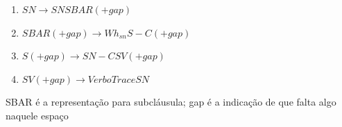\begin{enumerate}
  \item $SN \rightarrow SN SBAR(+gap)$
  \item $SBAR(+gap) \rightarrow Wh_{sn} S-C(+gap)$
  \item $S(+gap) \rightarrow SN-C SV(+gap)$
  \item $SV(+gap) \rightarrow Verbo Trace SN$
\end{enumerate}


SBAR é a representação para subcláusula; gap é a indicação de que falta algo naquele espaço




